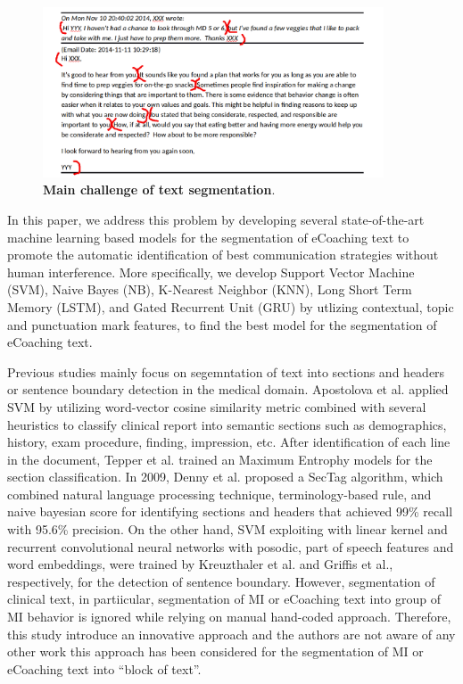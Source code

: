 \documentclass{amia}
\begin{document}
\begin{figure}[!htb]
    \centering
    \includegraphics[width=0.9\textwidth]{figures/segment-example.png}
    \caption{\textbf{Main challenge of text segmentation}.}
    \label{fig:text-segment}
\end{figure}

In this paper, we address this problem by developing several state-of-the-art machine learning based models for the segmentation of eCoaching text to promote the automatic identification of best communication strategies without human interference. More specifically, we develop Support Vector Machine (SVM), Naive Bayes (NB), K-Nearest Neighbor (KNN), Long Short Term Memory (LSTM), and Gated Recurrent Unit (GRU) by utlizing contextual, topic and punctuation mark features, to find the best model for the segmentation of eCoaching text. 

Previous studies mainly focus on segemntation of text into sections and headers\cite{apostolova2009automatic,denny2009evaluation,tepper2012statistical,cho2002text} or sentence boundary detection\cite{griffis2016quantitative,kreuzthaler2015detection,treviso2016sentence} in the medical domain. Apostolova et al.\cite{apostolova2009automatic} applied SVM by utilizing word-vector cosine similarity metric combined with several heuristics to classify clinical report into semantic sections such as demographics, history, exam procedure, finding, impression, etc. After identification of each line in the document, Tepper et al. \cite{tepper2012statistical} trained an Maximum Entrophy models for the section classification. In 2009, Denny et al.\cite{denny2009evaluation} proposed a SecTag algorithm, which combined natural language processing technique, terminology-based rule, and naive bayesian score for identifying sections and headers that achieved 99\% recall with 95.6\% precision. On the other hand, SVM exploiting with linear kernel and recurrent convolutional neural networks with posodic, part of speech features and word embeddings, were trained by Kreuzthaler et al.\cite{kreuzthaler2015detection} and Griffis et al.\cite{griffis2016quantitative}, respectively, for the detection of sentence boundary. However, segmentation of clinical text, in partiicular, segmentation of MI or eCoaching text into group of MI behavior is ignored while relying on manual hand-coded approach. Therefore, this study introduce an innovative approach and the authors are not aware of any other work this approach has been considered for the segmentation of MI or eCoaching text into ``block of text''. 
\end{document}
